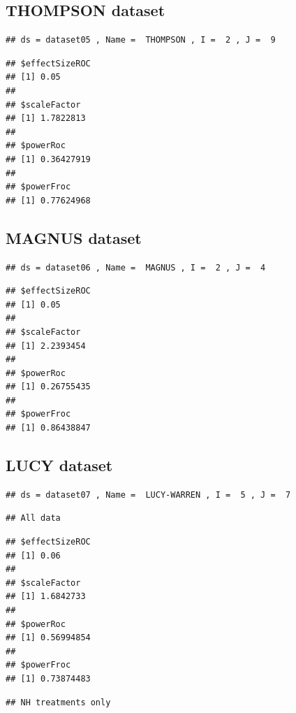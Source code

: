 \documentclass[
]{book}
\begin{document}
\hypertarget{thompson-dataset}{%
\subsection{THOMPSON dataset}\label{thompson-dataset}}

\begin{verbatim}
## ds = dataset05 , Name =  THOMPSON , I =  2 , J =  9
\end{verbatim}

\begin{verbatim}
## $effectSizeROC
## [1] 0.05
## 
## $scaleFactor
## [1] 1.7822813
## 
## $powerRoc
## [1] 0.36427919
## 
## $powerFroc
## [1] 0.77624968
\end{verbatim}

\hypertarget{magnus-dataset}{%
\subsection{MAGNUS dataset}\label{magnus-dataset}}

\begin{verbatim}
## ds = dataset06 , Name =  MAGNUS , I =  2 , J =  4
\end{verbatim}

\begin{verbatim}
## $effectSizeROC
## [1] 0.05
## 
## $scaleFactor
## [1] 2.2393454
## 
## $powerRoc
## [1] 0.26755435
## 
## $powerFroc
## [1] 0.86438847
\end{verbatim}

\hypertarget{lucy-dataset}{%
\subsection{LUCY dataset}\label{lucy-dataset}}

\begin{verbatim}
## ds = dataset07 , Name =  LUCY-WARREN , I =  5 , J =  7
\end{verbatim}

\begin{verbatim}
## All data
\end{verbatim}

\begin{verbatim}
## $effectSizeROC
## [1] 0.06
## 
## $scaleFactor
## [1] 1.6842733
## 
## $powerRoc
## [1] 0.56994854
## 
## $powerFroc
## [1] 0.73874483
\end{verbatim}

\begin{verbatim}
## NH treatments only
\end{verbatim}
\end{document}
